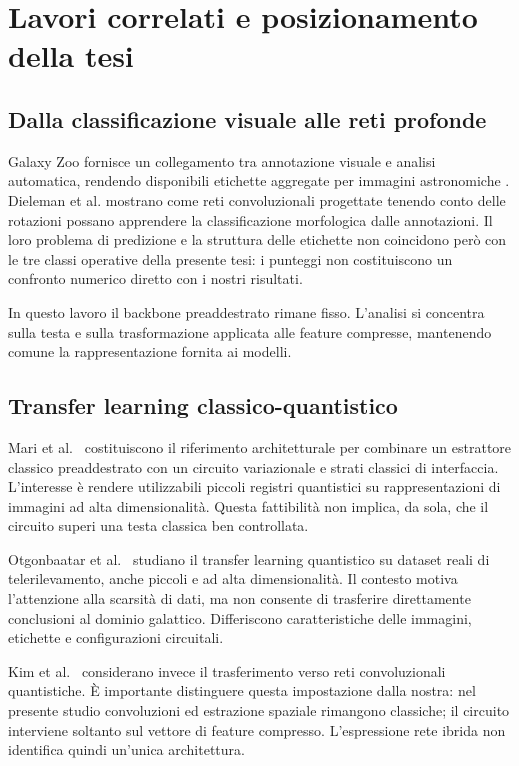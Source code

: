 \section{Lavori correlati e posizionamento della tesi}
\label{sec:fond-correlati}

\subsection{Dalla classificazione visuale alle reti profonde}

Galaxy Zoo fornisce un collegamento tra annotazione visuale e analisi
automatica, rendendo disponibili etichette aggregate per immagini
astronomiche \cite{lintott2011galaxyzoo}. Dieleman et al.
\cite{dieleman2015galaxy} mostrano come reti convoluzionali progettate
tenendo conto delle rotazioni possano apprendere la classificazione
morfologica dalle annotazioni. Il loro problema di predizione e la
struttura delle etichette non coincidono però con le tre classi operative
della presente tesi: i punteggi non costituiscono un confronto numerico
diretto con i nostri risultati.

In questo lavoro il backbone preaddestrato rimane fisso. L'analisi si
concentra sulla testa e sulla trasformazione applicata alle feature
compresse, mantenendo comune la rappresentazione fornita ai modelli.

\subsection{Transfer learning classico-quantistico}

Mari et al.~\cite{mari2020transfer} costituiscono il riferimento
architetturale per combinare un estrattore classico preaddestrato con
un circuito variazionale e strati classici di interfaccia. L'interesse
è rendere utilizzabili piccoli registri quantistici su rappresentazioni
di immagini ad alta dimensionalità. Questa fattibilità non implica,
da sola, che il circuito superi una testa classica ben controllata.

Otgonbaatar et al.~\cite{otgonbaatar2023transfer} studiano il transfer
learning quantistico su dataset reali di telerilevamento, anche piccoli
e ad alta dimensionalità. Il contesto motiva l'attenzione alla scarsità
di dati, ma non consente di trasferire direttamente conclusioni al
dominio galattico. Differiscono caratteristiche delle immagini,
etichette e configurazioni circuitali.

Kim et al.~\cite{kim2023transfer} considerano invece il trasferimento
verso reti convoluzionali quantistiche. È importante distinguere questa
impostazione dalla nostra: nel presente studio convoluzioni ed estrazione
spaziale rimangono classiche; il circuito interviene soltanto sul vettore
di feature compresso. L'espressione rete ibrida non identifica quindi
un'unica architettura.

